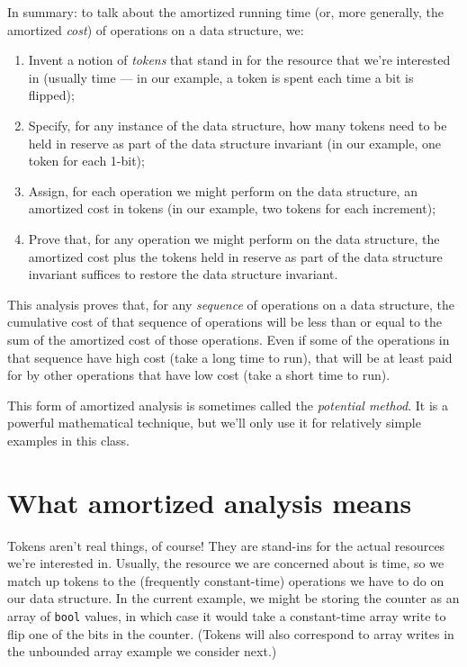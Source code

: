 In summary: to talk about the amortized running time (or, more
generally, the amortized \emph{cost}) of operations on a data
structure, we:
\begin{enumerate}
\item%
  Invent a notion of \emph{tokens} that stand in for the resource that
  we're interested in (usually time --- in our example, a token is
  spent each time a bit is flipped);
\item%
  Specify, for any instance of the data structure, how many tokens
  need to be held in reserve as part of the data structure invariant
  (in our example, one token for each 1-bit);
\item%
  Assign, for each operation we might perform on the data structure,
  an amortized cost in tokens (in our example, two tokens for each
  increment);
\item%
  Prove that, for any operation we might perform on the data
  structure, the amortized cost plus the tokens held in reserve as
  part of the data structure invariant suffices to restore the data
  structure invariant.
\end{enumerate}
This analysis proves that, for any \emph{sequence} of operations on a
data structure, the cumulative cost of that sequence of operations
will be less than or equal to the sum of the amortized cost of those
operations. Even if some of the operations in that sequence have high
cost (take a long time to run), that will be at least paid for by
other operations that have low cost (take a short time to run).

This form of amortized analysis is sometimes called the
\emph{potential method}. It is a powerful mathematical technique, but
we'll only use it for relatively simple examples in this class.


\section{What amortized analysis means}
\label{sec:ubarrays:theory}

Tokens aren't real things, of course! They are stand-ins for the
actual resources we're interested in. Usually, the resource we are
concerned about is time, so we match up tokens to the (frequently
constant-time) operations we have to do on our data structure. In the
current example, we might be storing the counter as an array of
\lstinline'bool' values, in which case it would take a constant-time
array write to flip one of the bits in the counter. (Tokens will also
correspond to array writes in the unbounded array example we consider
next.)

